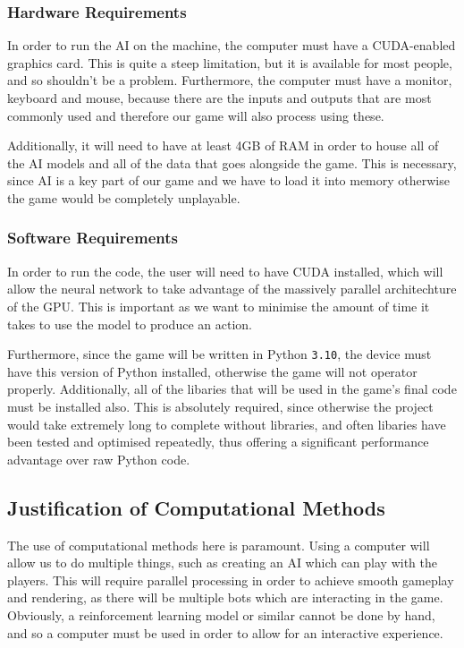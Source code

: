 \subsubsection{Hardware Requirements}

In order to run the AI on the machine, the computer must have a CUDA-enabled graphics card. This is quite a steep limitation, but it is available for most people, and so shouldn't be a problem. Furthermore, the computer must have a monitor, keyboard and mouse, because there are the inputs and outputs that are most commonly used and therefore our game will also process using these.

\vs
Additionally, it will need to have at least 4GB of RAM in order to house all of the AI models and all of the data that goes alongside the game. This is necessary, since AI is a key part of our game and we have to load it into memory otherwise the game would be completely unplayable.

\vs
\subsubsection{Software Requirements}

In order to run the code, the user will need to have CUDA installed, which will allow the neural network to take advantage of the massively parallel architechture of the GPU. This is important as we want to minimise the amount of time it takes to use the model to produce an action. 

\vs

Furthermore, since the game will be written in Python \verb|3.10|, the device must have this version of Python installed, otherwise the game will not operator properly. Additionally, all of the libaries that will be used in the game's final code must be installed also. This is absolutely required, since otherwise the project would take extremely long to complete without libraries, and often libaries have been tested and optimised repeatedly, thus offering a significant performance advantage over raw Python code.

\subsection{Justification of Computational Methods}

The use of computational methods here is paramount. Using a computer will allow us to do multiple things, such as creating an AI which can play with the players. This will require parallel processing in order to achieve smooth gameplay and rendering, as there will be multiple bots which are interacting in the game. Obviously, a reinforcement learning model or similar cannot be done by hand, and so a computer must be used in order to allow for an interactive experience.

